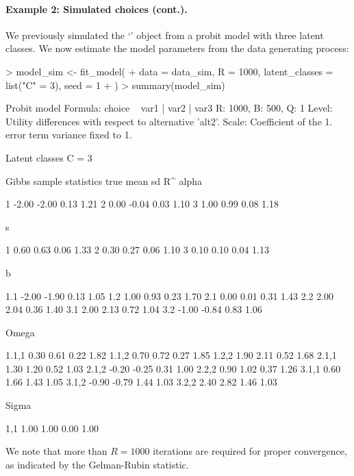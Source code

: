 \documentclass[article,shortnames]{jss}
\newcommand{\class}[1]{`\code{#1}'}
\begin{document}
\paragraph{Example 2: Simulated choices (cont.).}

We previously simulated the \class{RprobitB\_data} object  from a probit model with three latent classes. We now estimate the model parameters from the data generating process:

\begin{Schunk}
\begin{Sinput}
> model_sim <- fit_model(
+    data = data_sim, R = 1000, latent_classes = list("C" = 3), seed = 1
+  )
> summary(model_sim)
\end{Sinput}
\begin{Soutput}
Probit model
Formula: choice ~ var1 | var2 | var3
R: 1000, B: 500, Q: 1
Level: Utility differences with respect to alternative 'alt2'.
Scale: Coefficient of the 1. error term variance fixed to 1.

Latent classes
C = 3

Gibbs sample statistics
          true    mean      sd      R^
 alpha

     1   -2.00   -2.00    0.13    1.21
     2    0.00   -0.04    0.03    1.10
     3    1.00    0.99    0.08    1.18

 s

     1    0.60    0.63    0.06    1.33
     2    0.30    0.27    0.06    1.10
     3    0.10    0.10    0.04    1.13

 b

   1.1   -2.00   -1.90    0.13    1.05
   1.2    1.00    0.93    0.23    1.70
   2.1    0.00    0.01    0.31    1.43
   2.2    2.00    2.04    0.36    1.40
   3.1    2.00    2.13    0.72    1.04
   3.2   -1.00   -0.84    0.83    1.06

 Omega

 1.1,1    0.30    0.61    0.22    1.82
 1.1,2    0.70    0.72    0.27    1.85
 1.2,2    1.90    2.11    0.52    1.68
 2.1,1    1.30    1.20    0.52    1.03
 2.1,2   -0.20   -0.25    0.31    1.00
 2.2,2    0.90    1.02    0.37    1.26
 3.1,1    0.60    1.66    1.43    1.05
 3.1,2   -0.90   -0.79    1.44    1.03
 3.2,2    2.40    2.82    1.46    1.03

 Sigma

   1,1    1.00    1.00    0.00    1.00
\end{Soutput}
\end{Schunk}

We note that more than $R = 1000$ iterations are required for proper convergence, as indicated by the Gelman-Rubin statistic.
\end{document}
